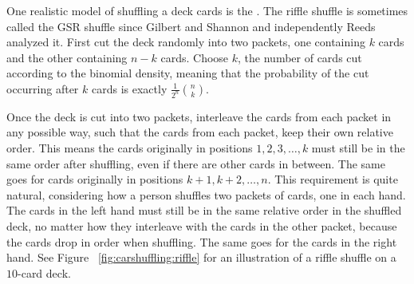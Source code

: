 \documentclass[12pt]{article}
\begin{document}
One realistic model of shuffling a deck cards is the .%
The riffle shuffle is sometimes called the GSR shuffle since Gilbert and
Shannon and independently Reeds analyzed it.  First cut the deck
randomly into two packets, one containing \( k \) cards and the other
containing \( n-k \) cards.  Choose \( k \), the number of cards cut
according to the binomial density, meaning that the probability of the
cut occurring after \( k \) cards is exactly \( \frac{1}{2^n}\binom{n}{k}
\).

Once the deck is cut into two packets, interleave the cards from each
packet in any possible way, such that the cards from each packet, keep
their own relative order.  This means the cards originally in positions \(
1, 2, 3, \dots, k \) must still be in the same order after shuffling,
even if there are other cards in between.  The same goes for cards
originally in positions \( k+1, k+2, \dots, n \).  This requirement is
quite natural, considering how a person shuffles two packets of
cards, one in each hand.  The cards in the left hand must still be in
the same relative order in the shuffled deck, no matter how they
interleave with the cards in the other packet, because the cards drop in
order when shuffling.  The same goes for the cards in the right hand.
See Figure~%
\ref{fig:carshuffling:riffle} for an illustration of a riffle shuffle on
a \( 10 \)-card deck.
\end{document}
